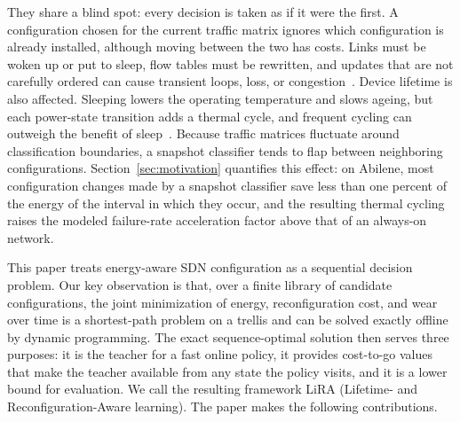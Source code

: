 \documentclass[journal]{IEEEtran}
\begin{document}
They share a blind spot: every decision is taken as if it were the first. A configuration chosen for the current traffic matrix ignores which configuration is already installed, although moving between the two has costs. Links must be woken up or put to sleep, flow tables must be rewritten, and updates that are not carefully ordered can cause transient loops, loss, or congestion~\cite{reitblatt2012abstractions,jin2014dionysus}. Device lifetime is also affected. Sleeping lowers the operating temperature and slows ageing, but each power-state transition adds a thermal cycle, and frequent cycling can outweigh the benefit of sleep~\cite{chiaraviglio2015lifetime,chiaraviglio2014impact}. Because traffic matrices fluctuate around classification boundaries, a snapshot classifier tends to flap between neighboring configurations. Section~\ref{sec:motivation} quantifies this effect: on Abilene, most configuration changes made by a snapshot classifier save less than one percent of the energy of the interval in which they occur, and the resulting thermal cycling raises the modeled failure-rate acceleration factor above that of an always-on network.

This paper treats energy-aware SDN configuration as a sequential decision problem. Our key observation is that, over a finite library of candidate configurations, the joint minimization of energy, reconfiguration cost, and wear over time is a shortest-path problem on a trellis and can be solved exactly offline by dynamic programming. The exact sequence-optimal solution then serves three purposes: it is the teacher for a fast online policy, it provides cost-to-go values that make the teacher available from any state the policy visits, and it is a lower bound for evaluation. We call the resulting framework LiRA (Lifetime- and Reconfiguration-Aware learning). The paper makes the following contributions.
\end{document}
